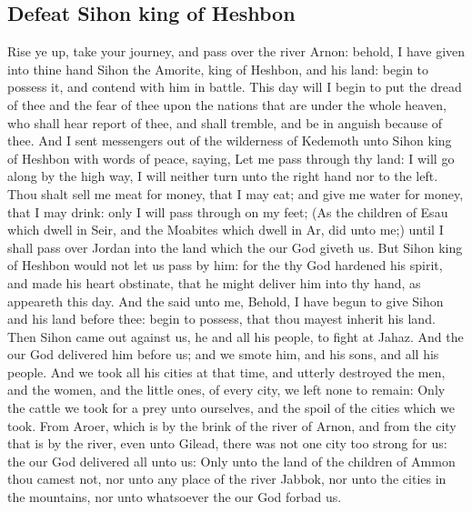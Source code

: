 \begin{biblechapter}
\section*{Defeat Sihon king of Heshbon}
\verse Rise ye up, take your journey, and pass over the river Arnon: behold, I have given into thine hand Sihon the Amorite, king of Heshbon, and his land: begin to possess it, and contend with him in battle.
\verse This day will I begin to put the dread of thee and the fear of thee upon the nations that are under the whole heaven, who shall hear report of thee, and shall tremble, and be in anguish because of thee.
\verse And I sent messengers out of the wilderness of Kedemoth unto Sihon king of Heshbon with words of peace, saying,
\verse Let me pass through thy land: I will go along by the high way, I will neither turn unto the right hand nor to the left.
\verse Thou shalt sell me meat for money, that I may eat; and give me water for money, that I may drink: only I will pass through on my feet;
\verse (As the children of Esau which dwell in Seir, and the Moabites which dwell in Ar, did unto me;) until I shall pass over Jordan into the land which the \LORD our God giveth us.
\verse But Sihon king of Heshbon would not let us pass by him: for the \LORD thy God hardened his spirit, and made his heart obstinate, that he might deliver him into thy hand, as appeareth this day.
\verse And the \LORD said unto me, Behold, I have begun to give Sihon and his land before thee: begin to possess, that thou mayest inherit his land.
\verse Then Sihon came out against us, he and all his people, to fight at Jahaz.
\verse And the \LORD our God delivered him before us; and we smote him, and his sons, and all his people.
\verse And we took all his cities at that time, and utterly destroyed the men, and the women, and the little ones, of every city, we left none to remain:
\verse Only the cattle we took for a prey unto ourselves, and the spoil of the cities which we took.
\verse From Aroer, which is by the brink of the river of Arnon, and from the city that is by the river, even unto Gilead, there was not one city too strong for us: the \LORD our God delivered all unto us:
\verse Only unto the land of the children of Ammon thou camest not, nor unto any place of the river Jabbok, nor unto the cities in the mountains, nor unto whatsoever the \LORD our God forbad us.
\end{biblechapter}

